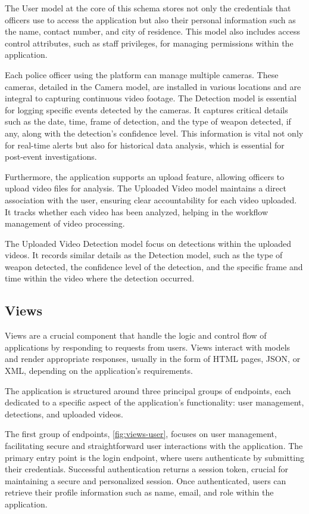 The User model at the core of this schema stores not only the credentials that officers use to access the application 
but also their personal information such as the name, contact number, and city of residence. This model also includes 
access control attributes, such as staff privileges, for managing 
permissions within the application.

Each police officer using the platform can manage multiple cameras. These cameras, detailed in the Camera model, 
are installed in various locations and are integral to capturing continuous video footage. The Detection model is 
essential for logging specific events detected by the cameras. It captures critical details such as the date, time, 
frame of detection, and the type of weapon detected, if any, along with the detection's confidence level. This 
information is vital not only for real-time alerts but also for historical data analysis, which is essential for 
post-event investigations.

Furthermore, the application supports an upload feature, allowing officers to upload video files for analysis. 
The Uploaded Video model maintains a direct association with the user, ensuring clear accountability for each 
video uploaded. It tracks whether each video has been analyzed, helping in the workflow management of video processing.

The Uploaded Video Detection model focus on detections within the uploaded videos. 
It records similar details as the Detection model, such as the type of weapon detected, the confidence level of 
the detection, and the specific frame and time within the video where the detection occurred.
\subsection{Views}
Views are a crucial component that handle the logic and control flow of applications by responding to requests from users.
Views interact with models and render appropriate responses, usually in the form of HTML pages, JSON, or XML, depending 
on the application's requirements.

The application is structured around three principal groups of endpoints, each dedicated to a specific aspect of 
the application's functionality: user management, detections, and uploaded videos. 

The first group of endpoints, \ref{fig:views-user}, focuses on user management, facilitating secure and straightforward user 
interactions with the application. The primary entry point is the login endpoint, where users authenticate by 
submitting their credentials. Successful authentication returns a session token, crucial for maintaining a 
secure and personalized session. Once authenticated, users can retrieve their profile information such as 
name, email, and role within the application.


